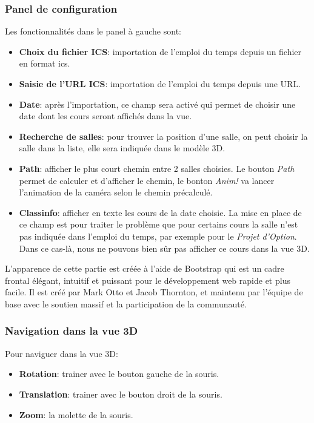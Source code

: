 \documentclass[twoside]{EPURapport}
\begin{document}
\subsubsection{Panel de configuration}
Les fonctionnalités dans le panel à gauche sont:
\begin{itemize}
	\item \textbf{Choix du fichier ICS}: importation de l'emploi du temps depuis un fichier en format ics.
    \item \textbf{Saisie de l'URL ICS}: importation de l'emploi du temps depuis une URL.
    \item \textbf{Date}: après l'importation, ce champ sera activé qui permet de choisir une date dont les cours seront affichés dans la vue.
    \item \textbf{Recherche de salles}: pour trouver la position d'une salle, on peut choisir la salle dans la liste, elle sera indiquée dans le modèle 3D.
    \item \textbf{Path}: afficher le plus court chemin entre 2 salles choisies. Le bouton \textit{Path} permet de calculer et d'afficher le chemin, le bonton \textit{Anim!} va lancer l'animation de la caméra selon le chemin précalculé.
    \item \textbf{Classinfo}: afficher en texte les cours de la date choisie. La mise en place de ce champ est pour traiter le problème que pour certains cours la salle n'est pas indiquée dans l'emploi du temps, par exemple pour le \textit{Projet d'Option}. Dans ce cas-là, nous ne pouvons bien sûr pas afficher ce cours dans la vue 3D.
\end{itemize}

L'apparence de cette partie est créée à l'aide de Bootstrap qui est un cadre frontal élégant, intuitif et puissant pour le développement web rapide et plus facile. Il est créé par Mark Otto et Jacob Thornton, et maintenu par l'équipe de base avec le soutien massif et la participation de la communauté.

\subsubsection{Navigation dans la vue 3D}
Pour naviguer dans la vue 3D:
\begin{itemize}
	\item \textbf{Rotation}: trainer avec le bouton gauche de la souris.
    \item \textbf{Translation}: trainer avec le bouton droit de la souris.
    \item \textbf{Zoom}: la molette de la souris.
\end{itemize}
\end{document}
